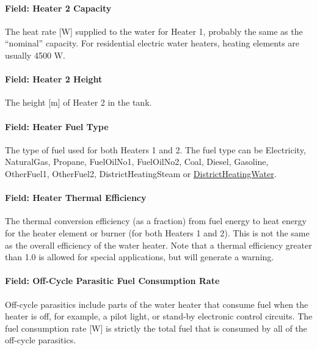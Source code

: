\paragraph{Field: Heater 2 Capacity}\label{field-heater-2-capacity}

The heat rate {[}W{]} supplied to the water for Heater 1, probably the same as the ``nominal'' capacity. For residential electric water heaters, heating elements are usually 4500 W.

\paragraph{Field: Heater 2 Height}\label{field-heater-2-height}

The height {[}m{]} of Heater 2 in the tank.

\paragraph{Field: Heater Fuel Type}\label{field-heater-fuel-type-1}

The type of fuel used for both Heaters 1 and 2. The fuel type can be Electricity, NaturalGas, Propane, FuelOilNo1, FuelOilNo2, Coal, Diesel, Gasoline, OtherFuel1, OtherFuel2, DistrictHeatingSteam or \hyperref[districtheating]{DistrictHeatingWater}.

\paragraph{Field: Heater Thermal Efficiency}\label{field-heater-thermal-efficiency-1}

The thermal conversion efficiency (as a fraction) from fuel energy to heat energy for the heater element or burner (for both Heaters 1 and 2). This is not the same as the overall efficiency of the water heater. Note that a thermal efficiency greater than 1.0 is allowed for special applications, but will generate a warning.

\paragraph{Field: Off-Cycle Parasitic Fuel Consumption Rate}\label{field-off-cycle-parasitic-fuel-consumption-rate-1}

Off-cycle parasitics include parts of the water heater that consume fuel when the heater is off, for example, a pilot light, or stand-by electronic control circuits. The fuel consumption rate {[}W{]} is strictly the total fuel that is consumed by all of the off-cycle parasitics.


